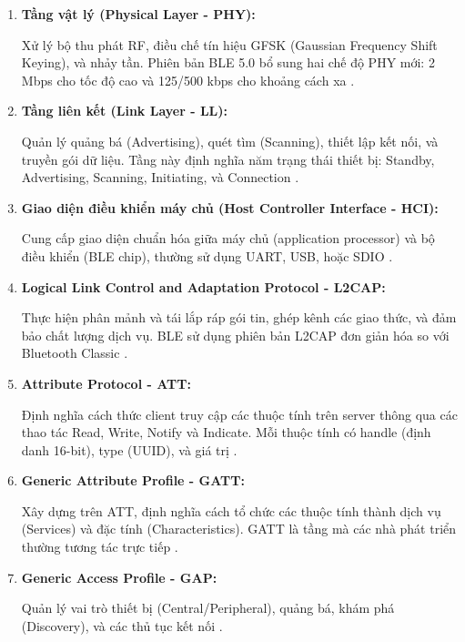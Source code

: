 \begin{enumerate}
    \item \textbf{Tầng vật lý (Physical Layer - PHY):} 
    
    Xử lý bộ thu phát RF, điều chế tín hiệu GFSK (Gaussian Frequency Shift 
    Keying), và nhảy tần. Phiên bản BLE 5.0 bổ sung hai chế độ PHY mới: 
    2 Mbps cho tốc độ cao và 125/500 kbps cho khoảng cách xa 
    \cite{ble_core}.
    
    \item \textbf{Tầng liên kết (Link Layer - LL):}
    
    Quản lý quảng bá (Advertising), quét tìm (Scanning), thiết lập kết nối, 
    và truyền gói dữ liệu. Tầng này định nghĩa năm trạng thái thiết bị: 
    Standby, Advertising, Scanning, Initiating, và Connection 
    \cite{gomez2012overview}.
    
    \item \textbf{Giao diện điều khiển máy chủ (Host Controller Interface - HCI):}
    
    Cung cấp giao diện chuẩn hóa giữa máy chủ (application processor) và 
    bộ điều khiển (BLE chip), thường sử dụng UART, USB, hoặc SDIO 
    \cite{bluetooth40}.
    
    \item \textbf{Logical Link Control and Adaptation Protocol - L2CAP:}
    
    Thực hiện phân mảnh và tái lắp ráp gói tin, ghép kênh các giao thức, 
    và đảm bảo chất lượng dịch vụ. BLE sử dụng phiên bản L2CAP đơn giản 
    hóa so với Bluetooth Classic \cite{heydon2013bluetooth}.
    
    \item \textbf{Attribute Protocol - ATT:}
    
    Định nghĩa cách thức client truy cập các thuộc tính trên server thông 
    qua các thao tác Read, Write, Notify và Indicate. Mỗi thuộc tính có 
    handle (định danh 16-bit), type (UUID), và giá trị \cite{bluetooth40}.
    
    \item \textbf{Generic Attribute Profile - GATT:}
    
    Xây dựng trên ATT, định nghĩa cách tổ chức các thuộc tính thành dịch vụ 
    (Services) và đặc tính (Characteristics). GATT là tầng mà các nhà phát 
    triển thường tương tác trực tiếp \cite{townsend2014getting}.
    
    \item \textbf{Generic Access Profile - GAP:}
    
    Quản lý vai trò thiết bị (Central/Peripheral), quảng bá, khám phá 
    (Discovery), và các thủ tục kết nối \cite{heydon2013bluetooth}.
\end{enumerate}


